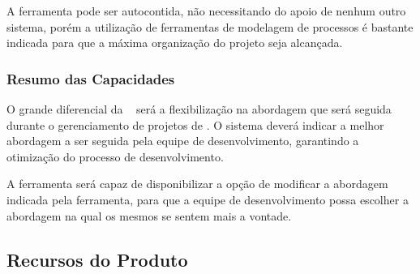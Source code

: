 A ferramenta pode ser autocontida, não necessitando do apoio de nenhum outro sistema, porém a utilização de ferramentas de modelagem de processos é bastante indicada para que a máxima organização do projeto seja alcançada.

\subsubsection{Resumo das Capacidades}
	
O grande diferencial da \nomeferramenta~ será a flexibilização na abordagem que será seguida durante o gerenciamento de projetos de \sw. O sistema deverá indicar a melhor abordagem a ser seguida pela equipe de desenvolvimento, garantindo a otimização do processo de desenvolvimento.

A ferramenta será capaz de disponibilizar a opção de modificar a abordagem indicada pela ferramenta, para que a equipe de desenvolvimento possa escolher a abordagem na qual os mesmos se sentem mais a vontade.

\subsection{Recursos do Produto}



